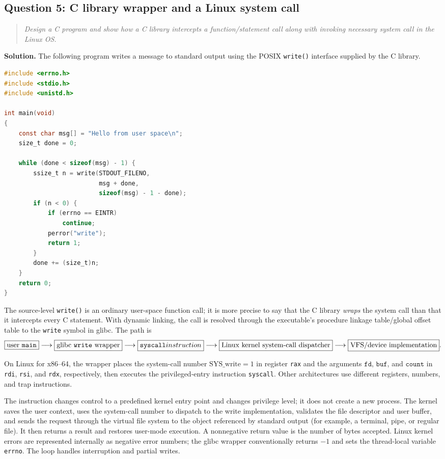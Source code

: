 \subsection{Question 5: C library wrapper and a Linux system call}
\begin{quote}
\itshape
Design a C program and show how a C library intercepts a function/statement
call along with invoking necessary system call in the Linux OS.
\end{quote}

\textbf{Solution.}
The following program writes a message to standard output using the POSIX
\texttt{write()} interface supplied by the C library.

\begin{lstlisting}[language=C]
#include <errno.h>
#include <stdio.h>
#include <unistd.h>

int main(void)
{
    const char msg[] = "Hello from user space\n";
    size_t done = 0;

    while (done < sizeof(msg) - 1) {
        ssize_t n = write(STDOUT_FILENO,
                          msg + done,
                          sizeof(msg) - 1 - done);
        if (n < 0) {
            if (errno == EINTR)
                continue;
            perror("write");
            return 1;
        }
        done += (size_t)n;
    }
    return 0;
}
\end{lstlisting}

The source-level \texttt{write()} is an ordinary user-space function call;
it is more precise to say that the C library \emph{wraps} the system call
than that it intercepts every C statement.  With dynamic linking, the call
is resolved through the executable's procedure linkage table/global offset
table to the \texttt{write} symbol in glibc.  The path is
\[
\boxed{\text{user \texttt{main}}}
\longrightarrow
\boxed{\text{glibc \texttt{write} wrapper}}
\longrightarrow
\boxed{\texttt{syscall} instruction}
\longrightarrow
\boxed{\text{Linux kernel system-call dispatcher}}
\longrightarrow
\boxed{\text{VFS/device implementation}}.
\]

On Linux for x86--64, the wrapper places the system-call number
\(\mathrm{SYS\_write}=1\) in register \texttt{rax} and the arguments
\(\texttt{fd}\), \(\texttt{buf}\), and \(\texttt{count}\) in
\texttt{rdi}, \texttt{rsi}, and \texttt{rdx}, respectively, then executes
the privileged-entry instruction \texttt{syscall}.  Other architectures use
different registers, numbers, and trap instructions.

The instruction changes control to a predefined kernel entry point and
changes privilege level; it does not create a new process.  The kernel saves
the user context, uses the system-call number to dispatch to the write
implementation, validates the file descriptor and user buffer, and sends the
request through the virtual file system to the object referenced by standard
output (for example, a terminal, pipe, or regular file).  It then returns a
result and restores user-mode execution.  A nonnegative return value is the
number of bytes accepted.  Linux kernel errors are represented internally
as negative error numbers; the glibc wrapper conventionally returns
\(-1\) and sets the thread-local variable \texttt{errno}.  The loop handles
interruption and partial writes.

